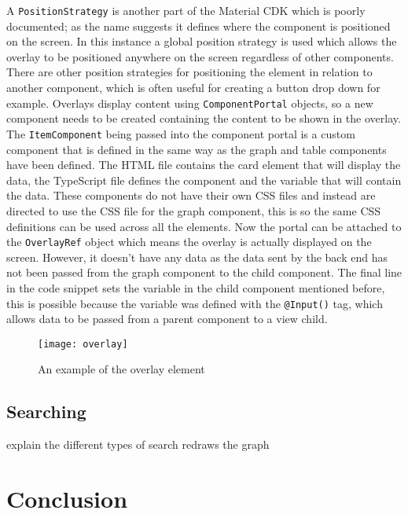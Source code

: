 A \verb|PositionStrategy| is another part of the Material CDK which is poorly documented; as the name suggests it defines where the component is positioned on the screen.
In this instance a global position strategy is used which allows the overlay to be positioned anywhere on the screen regardless of other components. There are 
other position strategies for positioning the element in relation to another component, which is often useful for creating a button drop down for example.
Overlays display content using \verb|ComponentPortal| objects, so a new component needs to be created containing the content to be shown in the overlay. 
The \verb|ItemComponent| being passed into the component portal is a custom component that is defined in the same way as the graph and table components have been defined.
The HTML file contains the card element that will display the data, the TypeScript file defines the component and the variable that will contain the data. These components do not 
have their own CSS files and instead are directed to use the CSS file for the graph component, this is so the same CSS definitions can be used across all the elements.
Now the portal can be attached to the \verb|OverlayRef| object which means the overlay is actually displayed on the screen. However, it doesn't have any data as the data sent by the 
back end has not been passed from the graph component to the child component. The final line in the code snippet sets the variable in the child component mentioned before, this is possible because 
the variable was defined with the \verb|@Input()| tag, which allows data to be passed from a parent component to a view child.
\begin{figure}[H]
    \centering
    \texttt{[image: overlay]}
    \caption{An example of the overlay element}
\end{figure}
\subsection{Searching}
explain the different types of search
redraws the graph
\section{Conclusion}